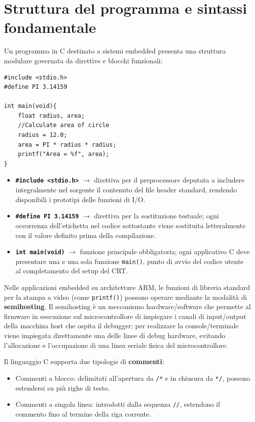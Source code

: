 \newpage
\section{Struttura del programma e sintassi fondamentale}
Un programma in C destinato a sistemi embedded presenta una struttura modulare governata da direttive e blocchi funzionali:
\begin{verbatim}
#include <stdio.h>
#define PI 3.14159

int main(void){
	float radius, area;
	//Calculate area of circle
	radius = 12.0;
	area = PI * radius * radius;
	printf("Area = %f", area);
}
\end{verbatim}
\begin{itemize}
    \item \textbf{\texttt{\#include <stdio.h>}} $\rightarrow$ direttiva per il preprocessore deputata a includere integralmente nel sorgente il contenuto del file header standard, rendendo disponibili i prototipi delle funzioni di I/O.
    \item \textbf{\texttt{\#define PI 3.14159}} $\rightarrow$ direttiva per la sostituzione testuale; ogni occorrenza dell'etichetta nel codice sottostante viene sostituita letteralmente con il valore definito prima della compilazione.
    \item \textbf{\texttt{int main(void)}} $\rightarrow$ funzione principale obbligatoria; ogni applicativo C deve presentare una e una sola funzione \texttt{main()}, punto di avvio del codice utente al completamento del setup del CRT.
\end{itemize}

Nelle applicazioni embedded su architetture ARM, le funzioni di libreria standard per la stampa a video (come \texttt{printf()}) possono operare mediante la modalità di \textbf{semihosting}. Il semihosting è un meccanismo hardware/software che permette al firmware in esecuzione sul microcontrollore di impiegare i canali di input/output della macchina host che ospita il debugger; per realizzare la console/terminale viene impiegata direttamente una delle linee di debug hardware, evitando l'allocazione e l'occupazione di una linea seriale fisica del microcontrollore.

Il linguaggio C supporta due tipologie di \textbf{commenti}:
\begin{itemize}
    \item Commenti a blocco: delimitati all'apertura da \texttt{/*} e in chiusura da \texttt{*/}, possono estendersi su più righe di testo.
    \item Commenti a singola linea: introdotti dalla sequenza \texttt{//}, estendono il commento fino al termine della riga corrente.
\end{itemize}

